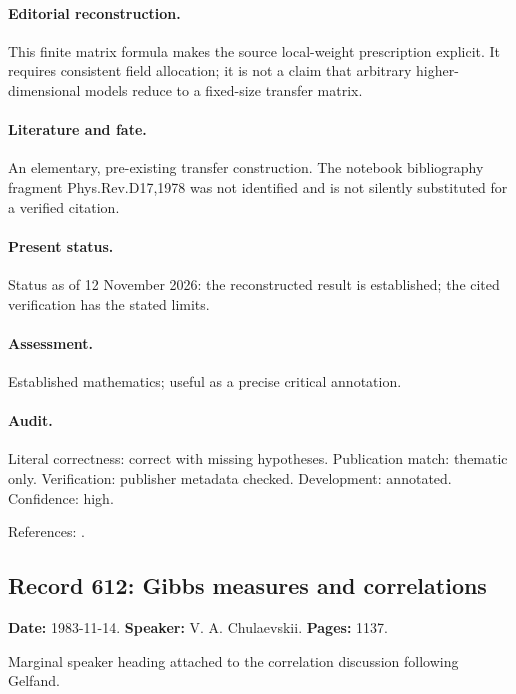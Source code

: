 \paragraph{Editorial reconstruction.} This finite matrix formula makes the source local-weight prescription explicit. It requires consistent field allocation; it is not a claim that arbitrary higher-dimensional models reduce to a fixed-size transfer matrix.

\paragraph{Literature and fate.} An elementary, pre-existing transfer construction. The notebook bibliography fragment Phys.Rev.D17,1978 was not identified and is not silently substituted for a verified citation.

\paragraph{Present status.} Status as of 12 November 2026: the reconstructed result is established; the cited verification has the stated limits.

\paragraph{Assessment.} Established mathematics; useful as a precise critical annotation.

\paragraph{Audit.} Literal correctness: correct with missing hypotheses. Publication match: thematic only. Verification: publisher metadata checked. Development: annotated. Confidence: high.

\noindent References: \citep{ising1925ferromagnetismus}.\par

\subsection{Record 612: Gibbs measures and correlations}

\label{talk:612}

\noindent\textbf{Date:} 1983-11-14. \textbf{Speaker:} V. A. Chulaevskii. \textbf{Pages:} 1137.\par

Marginal speaker heading attached to the correlation discussion following Gelfand.

